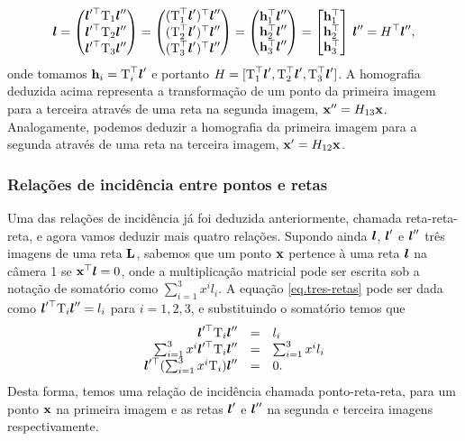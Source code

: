 \begin{equation*}
\boldsymbol{l}=
\begin{pmatrix}
\boldsymbol{l}'^\top \mbox{T}_1\boldsymbol{l}''\\
\boldsymbol{l}'^\top \mbox{T}_2\boldsymbol{l}''\\
\boldsymbol{l}'^\top \mbox{T}_3\boldsymbol{l}''
\end{pmatrix}=
\begin{pmatrix}
(\mbox{T}_1^\top\boldsymbol{l}')^\top\boldsymbol{l}''\\
(\mbox{T}_2^\top\boldsymbol{l}')^\top\boldsymbol{l}''\\
(\mbox{T}_3^\top\boldsymbol{l}')^\top\boldsymbol{l}''
\end{pmatrix}=
\begin{pmatrix}
{\bf h}_1^\top\boldsymbol{l}''\\
{\bf h}_2^\top\boldsymbol{l}''\\
{\bf h}_3^\top\boldsymbol{l}''
\end{pmatrix}=
\begin{bmatrix}
{\bf h}_1^\top\\
{\bf h}_2^\top\\
{\bf h}_3^\top
\end{bmatrix}\,\boldsymbol{l}''=
H^\top\boldsymbol{l}'',
\end{equation*}
onde tomamos ${\bf h}_i=\mbox{T}_i^\top\boldsymbol{l}'$ e portanto $H=[\mbox{T}_1^\top\boldsymbol{l}',\mbox{T}_2^\top\boldsymbol{l}',\mbox{T}_3^\top\boldsymbol{l}']$.
A homografia deduzida acima representa a transformação de um ponto da primeira imagem para a terceira através de uma reta na segunda imagem, $\mathbf{x}''=H_{13}\mathbf{x}$. Analogamente, podemos deduzir a homografia da primeira imagem para a segunda através de uma reta na terceira imagem, $\mathbf{x}'=H_{12}\mathbf{x}$.

\subsubsection{Relações de incidência entre pontos e retas}
Uma das relações de incidência já foi deduzida anteriormente, chamada reta-reta-reta, e agora vamos deduzir mais quatro relações. Supondo ainda $\boldsymbol{l}$, $\boldsymbol{l}'$ e $\boldsymbol{l}''$ três imagens de uma reta ${\bf L}$, sabemos que um ponto $\mathbf{x}$ pertence à uma reta $\boldsymbol{l}$ na câmera 1 se $\mathbf{x}^\top\boldsymbol{l}=0$, onde a multiplicação matricial pode ser escrita sob a notação de somatório como $\sum_{i=1}^{3}x^il_i$. A equação \ref{eq.tres-retas} pode ser dada como $\boldsymbol{l}'^\top \mbox{T}_i\boldsymbol{l}''
=l_i$ para $i=1,2,3$, e substituindo o somatório temos que
\begin{equation*}
\begin{array}{rcl}
\boldsymbol{l}'^\top \mbox{T}_i\boldsymbol{l}''
&=&l_i\\
\sum_{i=1}^3 x^i\boldsymbol{l}'^\top \mbox{T}_i\boldsymbol{l}''&=&\sum_{i=1}^3 x^il_i\\
\boldsymbol{l}'^\top(\sum_{i=1}^3 x^i\mbox{T}_i)\boldsymbol{l}''&=&0.
\end{array}
\end{equation*}
Desta forma, temos uma relação de incidência chamada ponto-reta-reta, para um ponto $\mathbf{x}$ na primeira imagem e as retas $\boldsymbol{l}'$ e $\boldsymbol{l}''$ na segunda e terceira imagens respectivamente. 

